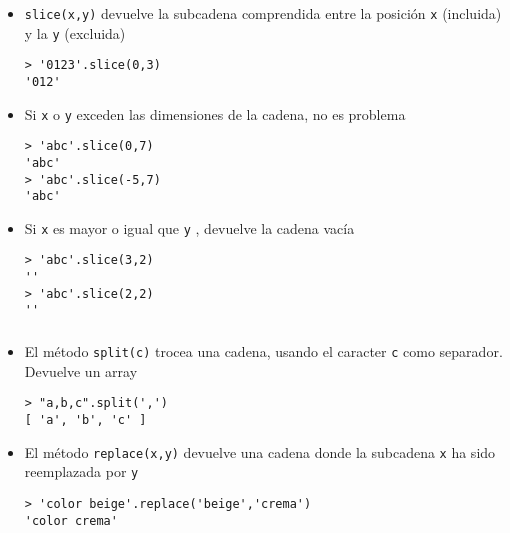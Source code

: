 \documentclass[ucs]{beamer}
\begin{document}
\begin{frame}[fragile]
\frametitle{}
\begin{itemize}
\item
\verb|slice(x,y)|
devuelve la subcadena comprendida entre la posición 
\verb|x| 
(incluida)
y la 
\verb|y| 
(excluida)

  \begin{scriptsize}
  \begin{verbatim}
> '0123'.slice(0,3)
'012'
  \end{verbatim}
  \end{scriptsize}
\item
Si 
\verb|x| 
o 
\verb|y| 
exceden las dimensiones de la cadena, no es problema

  \begin{scriptsize}
  \begin{verbatim}
> 'abc'.slice(0,7)
'abc'
> 'abc'.slice(-5,7)
'abc'
  \end{verbatim}
  \end{scriptsize}
\item
Si 
\verb|x| 
es mayor o igual que 
\verb|y| 
, devuelve la cadena vacía

  \begin{scriptsize}
  \begin{verbatim}
> 'abc'.slice(3,2)
''
> 'abc'.slice(2,2)
''
  \end{verbatim}
  \end{scriptsize}


\end{itemize}

\end{frame}



\begin{frame}[fragile]
\frametitle{}
\begin{itemize}
\item
El método
\verb|split(c)| 
trocea una cadena, usando el caracter 
\verb|c| 
como separador. Devuelve un array

  \begin{scriptsize}
  \begin{verbatim}
> "a,b,c".split(',')
[ 'a', 'b', 'c' ]
  \end{verbatim}
  \end{scriptsize}

\item
El método
\verb|replace(x,y)| 
devuelve una cadena donde la subcadena
\verb|x| 
ha sido reemplazada por
\verb|y| 

  \begin{scriptsize}
  \begin{verbatim}
> 'color beige'.replace('beige','crema')
'color crema'
  \end{verbatim}
  \end{scriptsize}

\end{itemize}

\end{frame}
\end{document}

